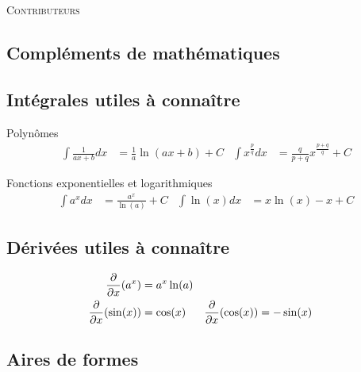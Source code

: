 \documentclass[10pt, french]{article}
\begin{document}
\begin{center}
	\textsc{\Large Contributeurs}\\[0.5cm] 
\end{center}


\newpage
\raggedcolumns
\begin{multicols*}{2}

\section{Compléments de mathématiques}

\subsection*{Intégrales utiles à connaître}
\begin{conceptgen}{Polynômes}
\begin{align*}
	\int \frac{1}{ax + b} dx 
	&=	\frac{1}{a} \ln(ax + b) + C	&
	\int x^{\frac{p}{q}}dx
	&=	\frac{q}{p + q} x^{\frac{p + q}{q}} + C	
\end{align*}
\end{conceptgen}

\begin{conceptgen}{Fonctions exponentielles et logarithmiques}
\begin{align*}
	\int a^{x} dx 
	&=	\frac{a^{x}}{\ln(a)} + C	&
	\int \ln(x) dx 
	&=	x \ln(x) - x + C	
\end{align*}
\end{conceptgen}

\subsection*{Dérivées utiles à connaître}

\begin{align*}
	\frac{\partial}{\partial x}(a^{x})
	&=	a^{x}\ln(a)	\\
	\frac{\partial}{\partial x}(\sin(x))
	&=	\cos(x)	&
	\frac{\partial}{\partial x}(\cos(x))
	&=	-\sin(x)	\\	
\end{align*}

\subsection*{Aires de formes}

\begin{center}


\end{center}
\end{multicols*}
\end{document}
